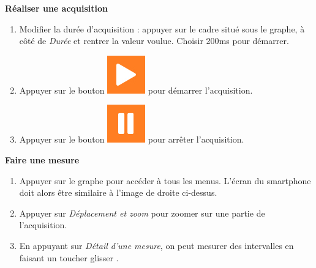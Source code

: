 \documentclass[12pt,a4paper]{article}
\begin{document}
\begin{doc}
\vspace{-2\baselineskip}
\begin{multicols}{2}
\textbf{Réaliser une acquisition}
\begin{enumerate}
\item Modifier la durée d'acquisition : appuyer sur le cadre situé sous le graphe, à côté de \emph{Durée} et rentrer la valeur voulue.
Choisir \unit{200}{ms} pour démarrer.
\item Appuyer sur le bouton \includegraphics[height=0.75\baselineskip]{images/phyphox_play.jpeg} pour démarrer l'acquisition.
\item Appuyer sur le bouton \includegraphics[height=0.75\baselineskip]{images/phyphox_pause.jpeg} pour arrêter l'acquisition.
\end{enumerate}
\newpage

\textbf{Faire une mesure}
\begin{enumerate}
\item Appuyer sur le graphe pour accéder à tous les menus.
L'écran du smartphone doit alors être similaire à l'image de droite ci-dessus.
\item Appuyer sur \emph{Déplacement et zoom} pour zoomer sur une partie de l'acquisition.
\item En appuyant sur \emph{Détail d'une mesure}, on peut mesurer des intervalles en faisant un \og toucher glisser \fg{}. 
\end{enumerate}
\end{multicols}
\end{doc}
\end{document}
